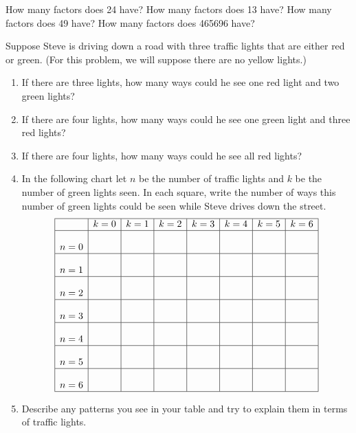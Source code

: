 \documentclass[nooutcomes,noauthor]{ximera}
\begin{document}
\begin{problem}
How many factors does 24 have?  How many factors does 13 have?  How many factors does 49 have?  How many factors does 465696 have?
\end{problem}

\begin{problem} 
Suppose Steve is driving down a road with three traffic lights that are either red or green.  (For this problem, we will suppose there are no yellow lights.)

\begin{enumerate}
\item If there are three lights, how many ways could he see one red light and two green lights?
\item If there are four lights, how many ways could he see one green light and three red lights?  
\item If there are four lights, how many ways could he see all red lights?  

 \item In the following chart let $n$ be the number of traffic lights and $k$ be  the number of green lights seen. In each square, write the number of ways this number of green lights could be seen while Steve drives down the street.
\[
\begin{array}{|c|c|c|c|c|c|c|c|}
    \hline
          & k=0 & k=1 & k=2 & k=3 & k=4 & k=5 & k = 6\\
    \hline
    n=0 &\rule[0mm]{0mm}{7mm}&       &       &       &       &   &   \\
    \hline
    n=1 &\rule[0mm]{0mm}{7mm}  &       &       &       &       &   &   \\
    \hline
    n=2 & \rule[0mm]{0mm}{7mm} &     &     &       &       &    &  \\
    \hline
    n=3 &\rule[0mm]{0mm}{7mm}       &       &       &       &       &   &   \\
    \hline
    n=4 & \rule[0mm]{0mm}{7mm}      &       &       &       &       &   &   \\
    \hline
    n=5 &\rule[0mm]{0mm}{7mm}       &       &       &       &       &   &   \\
    \hline
    n=6 &\rule[0mm]{0mm}{7mm}       &       &       &       &       &   &   \\
    \hline
\end{array}
\]
\item Describe any patterns you see in your table and try to explain them in terms of traffic lights.
\end{enumerate}

\end{problem}
\end{document}

